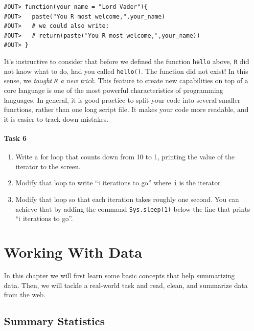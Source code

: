 \documentclass[]{book}
\providecommand{\tightlist}{%
  \setlength{\itemsep}{0pt}\setlength{\parskip}{0pt}}
\begin{document}
\begin{verbatim}
#OUT> function(your_name = "Lord Vader"){
#OUT>   paste("You R most welcome,",your_name)
#OUT>   # we could also write:
#OUT>   # return(paste("You R most welcome,",your_name))
#OUT> }
\end{verbatim}

It's instructive to consider that before we defined the function
\texttt{hello} above, \texttt{R} did not know what to do, had you called
\texttt{hello()}. The function did not exist! In this sense, we
\emph{taught \texttt{R} a new trick}. This feature to create new
capabilities on top of a core language is one of the most powerful
characteristics of programming languages. In general, it is good
practice to split your code into several smaller functions, rather than
one long script file. It makes your code more readable, and it is easier
to track down mistakes.

\subsubsection{Task 6}\label{task-6}

\begin{enumerate}
\def\labelenumi{\arabic{enumi}.}
\tightlist
\item
  Write a for loop that counts down from 10 to 1, printing the value of
  the iterator to the screen.
\item
  Modify that loop to write ``i iterations to go'' where \texttt{i} is
  the iterator
\item
  Modify that loop so that each iteration takes roughly one second. You
  can achieve that by adding the command \texttt{Sys.sleep(1)} below the
  line that prints ``i iterations to go''.
\end{enumerate}

\chapter{Working With Data}\label{sum}

In this chapter we will first learn some basic concepts that help
summarizing data. Then, we will tackle a real-world task and read,
clean, and summarize data from the web.

\section{Summary Statistics}\label{summary-statistics}
\end{document}
